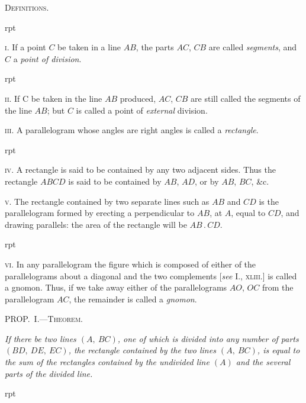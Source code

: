 \documentclass[oneside]{book}
\newcommand\mypropl[2]{
\bigskip\Needspace*{4\baselineskip}\begin{center}\textsc{#1}\end{center}
\hspace{\parindent}\emph{#2}\par\medskip
}
\newcommand\imgflow[3]{
\setcounter{wrapwidth}{#1}
\begin{wrapfigure}[#2]{r}{\value{wrapwidth}pt}
\begin{center}
\vspace{-0.3in}
\end{center}
\end{wrapfigure}
}
\newcommand\imgcent[2]{
\begin{center}
\end{center}
}
\begin{document}
\bigskip
\begin{center}
\textsc{Definitions.}
\end{center}

\imgflow{120}{2}{f072}

\textsc{i}. If a point $C$ be taken in a line $AB$, the parts $AC$,
$CB$ are called \emph{segments}, and $C$ a
\emph{point of division}.

\imgflow{140}{2}{f073}

\textsc{ii}. If C be taken in the line $AB$ produced, $AC$, $CB$ are
still called the segments of
the line $AB$; but $C$ is called
a point of \emph{external} division.

\textsc{iii}. A parallelogram whose angles are right angles is
called a \emph{rectangle}.

\imgflow{135}{8}{f074}

\textsc{iv}. A rectangle is said to
be contained by any two adjacent
sides. Thus the rectangle
$ABCD$ is said to be contained
by $AB$, $AD$, or by $AB$, $BC$,
\&c.

\textsc{v}. The rectangle contained by two separate lines
such as $AB$ and
$CD$ is the parallelogram
formed by erecting a perpendicular to $AB$, at
$A$, equal to $CD$, and drawing parallels: the area of the
rectangle will be $AB\,.\,CD$.

\imgcent{208}{f075}

\imgflow{140}{8}{f076}

\textsc{vi}. In any parallelogram the figure which is composed
of either of the parallelograms
about a diagonal
and the two complements
[\emph{see} I., \textsc{xliii}.] is called a
gnomon. Thus, if we take
away either of the parallelograms
$AO$, $OC$ from the
parallelogram $AC$, the remainder
is called a \emph{gnomon}.


\mypropl{PROP\@.~I.---Theorem.}{If there be two lines $(A,\ BC)$, one of which is divided
into any number of parts $(BD,\ DE,\ EC)$, the rectangle
contained by the two lines $(A,\ BC)$, is equal to the sum of
the rectangles contained by the undivided line $(A)$ and the
several parts of the divided line.}

\imgflow{185}{8}{f077}
\end{document}

